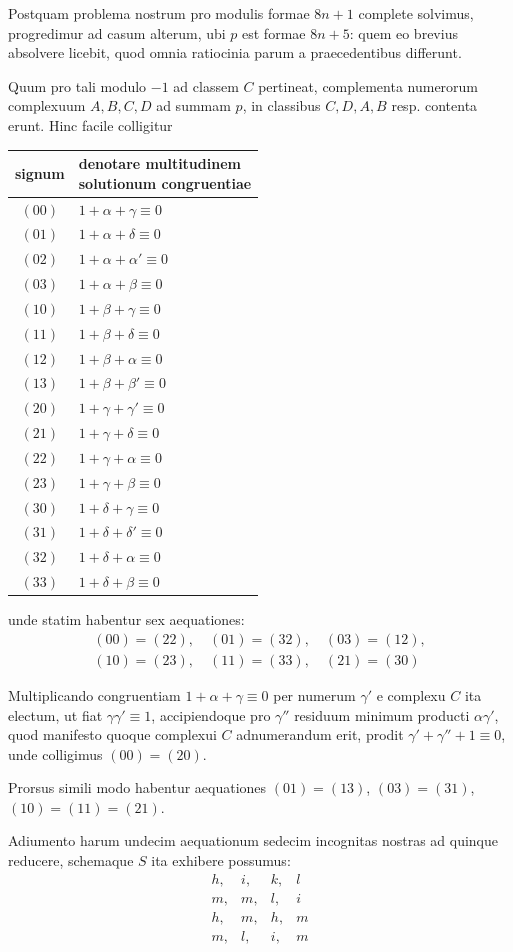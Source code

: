 Postquam problema nostrum pro modulis formae $8n+1$ complete solvimus, progredimur ad casum alterum, ubi $p$ est formae $8n+5$: quem eo brevius absolvere licebit, quod omnia ratiocinia parum a praecedentibus differunt.

Quum pro tali modulo $-1$ ad classem $C$ pertineat, complementa numerorum complexuum $A,B,C,D$ ad summam $p$, in classibus $C,D,A,B$ resp. contenta erunt. Hinc facile colligitur

%
\begin{center}
\begin{tabular}{c|l}
signum&\shortstack{denotare multitudinem\\solutionum congruentiae}\\\hline
$(00)$&$1+\alpha+\gamma\equiv0$\\
$(01)$&$1+\alpha+\delta\equiv0$\\
$(02)$&$1+\alpha+\alpha'\equiv0$\\
$(03)$&$1+\alpha+\beta\equiv0$\\
$(10)$&$1+\beta+\gamma\equiv0$\\
$(11)$&$1+\beta+\delta\equiv0$\\
$(12)$&$1+\beta+\alpha\equiv0$\\
$(13)$&$1+\beta+\beta'\equiv0$\\
$(20)$&$1+\gamma+\gamma'\equiv0$\\
$(21)$&$1+\gamma+\delta\equiv0$\\
$(22)$&$1+\gamma+\alpha\equiv0$\\
$(23)$&$1+\gamma+\beta\equiv0$\\
$(30)$&$1+\delta+\gamma\equiv0$\\
$(31)$&$1+\delta+\delta'\equiv0$\\
$(32)$&$1+\delta+\alpha\equiv0$\\
$(33)$&$1+\delta+\beta\equiv0$
\end{tabular}
\end{center}
unde statim habentur sex aequationes:
\[
\begin{gathered}
(00)=(22),\quad(01)=(32),\quad(03)=(12),\\
(10)=(23),\quad(11)=(33),\quad(21)=(30)
\end{gathered}
\]

Multiplicando congruentiam $1+\alpha+\gamma\equiv0$ per numerum $\gamma'$ e complexu $C$ ita electum, ut fiat $\gamma\gamma'\equiv1$, accipiendoque pro $\gamma''$ residuum minimum producti $\alpha\gamma'$, quod manifesto quoque complexui $C$ adnumerandum erit, prodit $\gamma'+\gamma''+1\equiv0$, unde colligimus $(00)=(20)$.

Prorsus simili modo habentur aequationes $(01)=(13)$, $(03)=(31)$, $(10)=(11)=(21)$.

Adiumento harum undecim aequationum sedecim incognitas nostras ad quinque reducere, schemaque $S$ ita exhibere possumus:
\[
\begin{array}{llll}
h,&i,&k,&l\\
m,&m,&l,&i\\
h,&m,&h,&m\\
m,&l,&i,&m
\end{array}
\]

